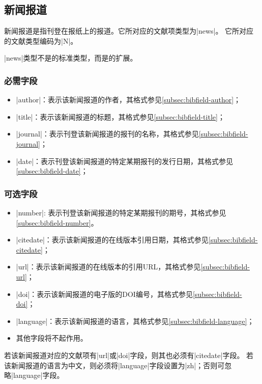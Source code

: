 \subsection{新闻报道}\label{subsec:bibtype-news}

新闻报道是指刊登在报纸上的报道。它所对应的{\BibTeX}文献项类型为|news|。
它所对应的文献类型编码为|N|\cite{gbt3469-1983}。

|news|类型不是{\BibTeX}的标准类型，而是{\njuthesis}的扩展。

\subsubsection{必需字段}

\begin{itemize}
\item |author|：表示该新闻报道的作者，其格式参见\ref{subsec:bibfield-author}；
\item |title|：表示该新闻报道的标题，其格式参见\ref{subsec:bibfield-title}；
\item |journal|：表示刊登该新闻报道的报刊的名称，其格式参见\ref{subsec:bibfield-journal}；
\item |date|：表示刊登该新闻报道的特定某期报刊的发行日期，其格式参见\ref{subsec:bibfield-date}；
\end{itemize}

\subsubsection{可选字段}

\begin{itemize}
\item |number|: 表示刊登该新闻报道的特定某期报刊的期号，其格式参见\ref{subsec:bibfield-number}。
\item |citedate|：表示该新闻报道的在线版本引用日期，其格式参见\ref{subsec:bibfield-citedate}；
\item |url|：表示该新闻报道的在线版本的引用URL，其格式参见\ref{subsec:bibfield-url}；
\item |doi|：表示该新闻报道的电子版的DOI编号，其格式参见\ref{subsec:bibfield-doi}；
\item |language|：表示该新闻报道的语言，其格式参见\ref{subsec:bibfield-language}；
\item 其他字段将不起作用。
\end{itemize}

\begin{note}
若该新闻报道对应的文献项有|url|或|doi|字段，则其也必须有|citedate|字段。
若该新闻报道的语言为中文，则必须将|language|字段设置为|zh|；否则可忽略|language|字段。
\end{note}


